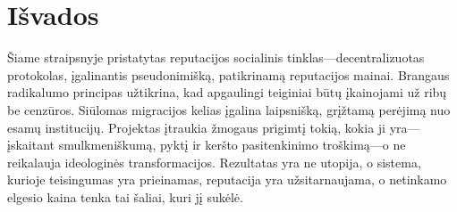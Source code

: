 \documentclass[11pt,a4paper,twocolumn]{article}
\begin{document}
\section{Išvados}

Šiame straipsnyje pristatytas reputacijos socialinis tinklas---decentralizuotas protokolas, įgalinantis pseudonimišką, patikrinamą reputacijos mainai. Brangaus radikalumo principas užtikrina, kad apgaulingi teiginiai būtų įkainojami už ribų be cenzūros. Siūlomas migracijos kelias įgalina laipsnišką, grįžtamą perėjimą nuo esamų institucijų. Projektas įtraukia žmogaus prigimtį tokią, kokia ji yra---įskaitant smulkmeniškumą, pyktį ir keršto pasitenkinimo troškimą---o ne reikalauja ideologinės transformacijos. Rezultatas yra ne utopija, o sistema, kurioje teisingumas yra prieinamas, reputacija yra užsitarnaujama, o netinkamo elgesio kaina tenka tai šaliai, kuri jį sukėlė.


\end{document}
